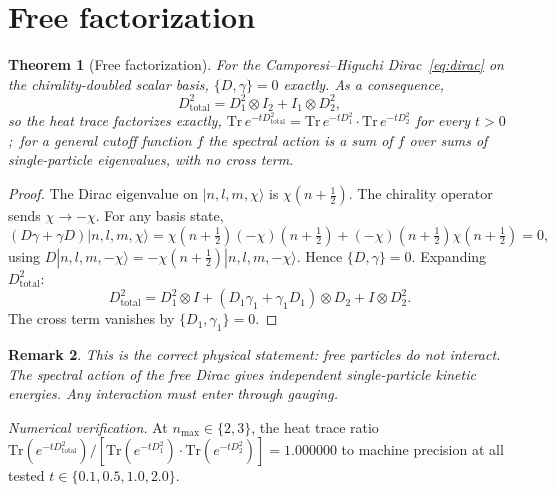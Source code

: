 \documentclass[twocolumn,pra,amsmath,amssymb,superscriptaddress]{revtex4-2}
\newtheorem{theorem}{Theorem}
\newtheorem{remark}[theorem]{Remark}
\begin{document}
\section{Free factorization}
\label{sec:free}

\begin{theorem}[Free factorization]
\label{thm:free_factorization}
For the Camporesi--Higuchi Dirac~\eqref{eq:dirac} on the
chirality-doubled scalar basis, $\{D, \gamma\} = 0$ exactly. As a
consequence,
\begin{equation}
  D_{\mathrm{total}}^2 = D_1^2 \otimes I_2 + I_1 \otimes D_2^2,
  \label{eq:D2_factorizes}
\end{equation}
so the heat trace factorizes exactly,
$\mathrm{Tr}\,e^{-tD_{\mathrm{total}}^2} = \mathrm{Tr}\,e^{-tD_1^2}
\cdot \mathrm{Tr}\,e^{-tD_2^2}$ for every $t > 0$;\ for a general
cutoff function $f$ the spectral action is a sum of $f$ over sums of
single-particle eigenvalues, with no cross term.
\end{theorem}

\begin{proof}
The Dirac eigenvalue on $|n, l, m, \chi\rangle$ is $\chi(n +
\frac{1}{2})$. The chirality operator sends $\chi \to -\chi$. For any
basis state,
\[
(D\gamma + \gamma D)|n,l,m,\chi\rangle =
\chi(n+\tfrac{1}{2})(-\chi)(n+\tfrac{1}{2})
+ (-\chi)(n+\tfrac{1}{2})\chi(n+\tfrac{1}{2}) = 0,
\]
using $D|n,l,m,-\chi\rangle = -\chi(n+\frac{1}{2})|n,l,m,-\chi\rangle$.
Hence $\{D,\gamma\} = 0$. Expanding $D_{\mathrm{total}}^2$:
\[
D_{\mathrm{total}}^2 = D_1^2 \otimes I + (D_1 \gamma_1 + \gamma_1
D_1) \otimes D_2 + I \otimes D_2^2.
\]
The cross term vanishes by $\{D_1, \gamma_1\} = 0$.
\end{proof}

\begin{remark}
This is the correct physical statement: free particles do not
interact. The spectral action of the free Dirac gives independent
single-particle kinetic energies. Any interaction must enter through
\emph{gauging}.
\end{remark}

\emph{Numerical verification.} At $n_{\max} \in \{2, 3\}$, the heat
trace ratio $\mathrm{Tr}(e^{-t D_{\mathrm{total}}^2}) /
[\mathrm{Tr}(e^{-t D_1^2}) \cdot \mathrm{Tr}(e^{-t D_2^2})] =
1.000000$ to machine precision at all tested $t \in \{0.1, 0.5, 1.0,
2.0\}$.
\end{document}
